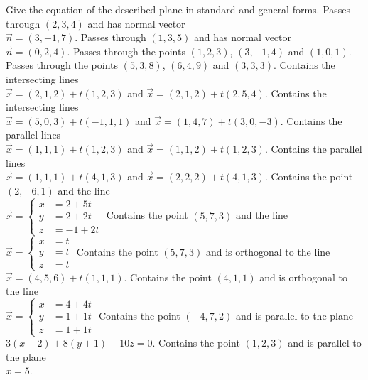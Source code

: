 
\begin{Exercise}[
name={},
title={}, 
difficulty=0,
origin={\cite{GHC}}]
Give the equation of the described plane in standard and general forms.
\Question Passes through $(2,3,4)$ and has normal vector\\ $\vec n= (3,-1,7)$.
\Question Passes through $(1,3,5)$ and has normal vector\\ $\vec n= (0,2,4)$.
\Question Passes through the points $(1,2,3)$, $(3,-1,4)$ and $(1,0,1)$.
\Question Passes through the points $(5,3,8)$, $(6,4,9)$ and $(3,3,3)$.
\Question Contains the intersecting lines\\
$\vec x = (2,1,2) + t(1,2,3)$ and 
$\vec x = (2,1,2) + t(2,5,4)$.
\Question Contains the intersecting lines\\
$\vec x = (5,0,3) + t(-1,1,1)$ and 
$\vec x = (1,4,7) + t(3,0,-3)$.
\Question Contains the parallel lines\\
$\vec x = (1,1,1) + t(1,2,3)$ and 
$\vec x = (1,1,2) + t(1,2,3)$.
\Question Contains the parallel lines\\
$\vec x = (1,1,1) + t(4,1,3)$ and 
$\vec x = (2,2,2) + t(4,1,3)$.
\Question Contains the point $(2,-6,1)$ and the line\\
$\vec x = \left\{\begin{aligned} x&=2+5t \\
																	y&=2+2t \\
																	z&=-1+2t \end{aligned}\right.$
\Question Contains the point $(5,7,3)$ and the line\\
$\vec x = \left\{\begin{aligned} x&=t \\
																	y&=t \\
																	z&=t \end{aligned}\right.$
\Question Contains the point $(5,7,3)$ and is orthogonal to the line\\
$\vec x =  (4,5,6)+ t(1,1,1)$.
\Question Contains the point $(4,1,1)$ and is orthogonal to the line\\
$\vec x = \left\{\begin{aligned} x&=4+4t \\
																	y&=1+1t \\
																	z&=1+1t \end{aligned}\right.$
\Question Contains the point $(-4,7,2)$ and is parallel to the plane\\
$ 3(x-2)+8(y+1) -10z=0$.
\Question Contains the point $(1,2,3)$ and is parallel to the plane\\
$x=5$.



\end{Exercise}
